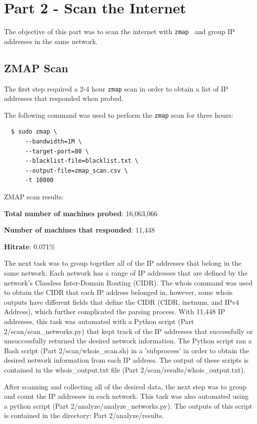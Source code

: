 \documentclass[11pt]{article}
\begin{document}
\newpage
\section*{Part 2 - Scan the Internet}
\label{sec:part-2}
The objective of this part was to scan the internet with \verb|zmap|~\cite{zmap} and group IP addresses in the same network.
\subsection*{ZMAP Scan}
The first step required a 2-4 hour \verb|zmap| scan in order to obtain a list of IP addresses that responded when probed.
\newline

\noindent The following command was used to perform the \verb|zmap| scan for three hours:
\begin{verbatim}
  $ sudo zmap \
      --bandwidth=1M \
      --target-port=80 \
      --blacklist-file=blacklist.txt \
      --output-file=zmap_scan.csv \
      -t 10800
\end{verbatim}
ZMAP scan results:

\textbf{Total number of machines probed}: 16,063,066

\textbf{Number of machines that responded}: 11,448

\textbf{Hitrate}: 0.071\%
\newline

The next task was to group together all of the IP addresses that belong in the same network.
Each network has a range of IP addresses that are defined by the network's Classless Inter-Domain Routing (CIDR).
The whois command was used to obtain the CIDR that each IP address belonged in, however,
some whois outputs have different fields that define the CIDR (CIDR, inetnum, and IPv4 Address), which further complicated the parsing process.
With 11,448 IP addresses, this task was automated with a Python script (Part 2/scan/scan\_networks.py) that kept track of the IP addresses that successfully or unsuccessfully returned the desired network information.
The Python script ran a Bash script (Part 2/scan/whois\_scan.sh) in a 'subprocess' in order to obtain the desired network information from each IP address.
The output of these scripts is contained in the whois\_output.txt file (Part 2/scan/results/whois\_output.txt).

After scanning and collecting all of the desired data, the next step was to group and count the IP addresses in each network.
This task was also automated using a python script (Part 2/analyze/analyze\_networks.py).
The outputs of this script is contained in the directory: Part 2/analyze/results.
\newline
\end{document}
